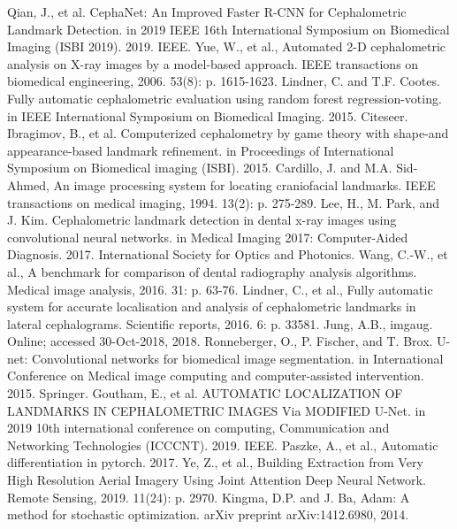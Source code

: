 \documentclass{elektr}
\begin{document}
\begin{thebibliography}{99}
	 Qian, J., et al. CephaNet: An Improved Faster R-CNN for Cephalometric Landmark Detection. in 2019 IEEE 16th International Symposium on Biomedical Imaging (ISBI 2019). 2019. IEEE. 
	 Yue, W., et al., Automated 2-D cephalometric analysis on X-ray images by a model-based approach. IEEE transactions on biomedical engineering, 2006. 53(8): p. 1615-1623.
	 Lindner, C. and T.F. Cootes. Fully automatic cephalometric evaluation using random forest regression-voting. in IEEE International Symposium on Biomedical Imaging. 2015. Citeseer.
	 Ibragimov, B., et al. Computerized cephalometry by game theory with shape-and appearance-based landmark refinement. in Proceedings of International Symposium on Biomedical imaging (ISBI). 2015.
	 Cardillo, J. and M.A. Sid-Ahmed, An image processing system for locating craniofacial landmarks. IEEE transactions on medical imaging, 1994. 13(2): p. 275-289.
	 Lee, H., M. Park, and J. Kim. Cephalometric landmark detection in dental x-ray images using convolutional neural networks. in Medical Imaging 2017: Computer-Aided Diagnosis. 2017. International Society for Optics and Photonics.
	 Wang, C.-W., et al., A benchmark for comparison of dental radiography analysis algorithms. Medical image analysis, 2016. 31: p. 63-76.
	 Lindner, C., et al., Fully automatic system for accurate localisation and analysis of cephalometric landmarks in lateral cephalograms. Scientific reports, 2016. 6: p. 33581.
	 Jung, A.B., imgaug. Online; accessed 30-Oct-2018, 2018.
	 Ronneberger, O., P. Fischer, and T. Brox. U-net: Convolutional networks for biomedical image segmentation. in International Conference on Medical image computing and computer-assisted intervention. 2015. Springer.
	 Goutham, E., et al. AUTOMATIC LOCALIZATION OF LANDMARKS IN CEPHALOMETRIC IMAGES Via MODIFIED U-Net. in 2019 10th international conference on computing, Communication and Networking Technologies (ICCCNT). 2019. IEEE.
	 Paszke, A., et al., Automatic differentiation in pytorch. 2017.
	 Ye, Z., et al., Building Extraction from Very High Resolution Aerial Imagery Using Joint Attention Deep Neural Network. Remote Sensing, 2019. 11(24): p. 2970.
	 Kingma, D.P. and J. Ba, Adam: A method for stochastic optimization. arXiv preprint arXiv:1412.6980, 2014.
	
\end{thebibliography}
\end{document}
